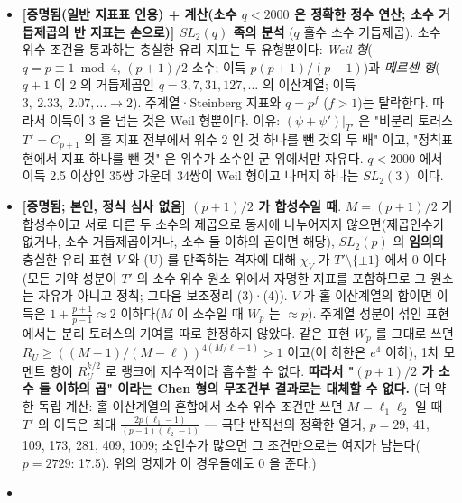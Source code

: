 \begin{itemize}
\item
  \textbf{{[}증명됨(일반 지표표 인용) + 계산(소수 \(q<2000\) 은 정확한 정수 연산; 소수 거듭제곱의 반 지표는 손으로){]} \(SL_2(q)\) 족의 분석} (\(q\) 홀수 소수 거듭제곱). 소수 위수 조건을 통과하는 충실한 유리 지표는 두 유형뿐이다: \emph{Weil 형}(\(q=p\equiv1\bmod4\), \((p+1)/2\) 소수; 이득 \(p(p+1)/(p-1)\))과 \emph{메르센 형}(\(q+1\) 이 2 의 거듭제곱인 \(q=3,7,31,127,\dots\) 의 이산계열; 이득 \(3,\ 2.33,\ 2.07,\dots\to2\)). 주계열·Steinberg 지표와 \(q=p^f\) (\(f>1\))는 탈락한다. 따라서 이득이 3 을 넘는 것은 Weil 형뿐이다. 이유: \((\psi+\psi')|_{T'}\) 은 "비분리 토러스 \(T'=C_{p+1}\) 의 홀 지표 전부에서 위수 2 인 것 하나를 뺀 것의 두 배" 이고, "정칙표현에서 지표 하나를 뺀 것" 은 위수가 소수인 군 위에서만 자유다. \(q<2000\) 에서 이득 2.5 이상인 35쌍 가운데 34쌍이 Weil 형이고 나머지 하나는 \(SL_2(3)\) 이다.
\item
  \textbf{{[}증명됨; 본인, 정식 심사 없음{]} \((p+1)/2\) 가 합성수일 때}. \(M=(p+1)/2\) 가 합성수이고 서로 다른 두 소수의 제곱으로 동시에 나누어지지 않으면(제곱인수가 없거나, 소수 거듭제곱이거나, 소수 둘 이하의 곱이면 해당), \(SL_2(p)\) 의 \textbf{임의의} 충실한 유리 표현 \(V\) 와 (U) 를 만족하는 격자에 대해 \(\chi_V\) 가 \(T'\setminus\{\pm1\}\) 에서 0 이다(모든 기약 성분이 \(T'\) 의 소수 위수 원소 위에서 자명한 지표를 포함하므로 그 원소는 자유가 아니고 정칙; 그다음 보조정리 (3)·(4)). \(V\) 가 홀 이산계열의 합이면 이득은 \(1+\tfrac{p+1}{p-1}\approx2\) 이하다(\(M\) 이 소수일 때 \(W_p\) 는 \(\approx p\)). 주계열 성분이 섞인 표현에서는 분리 토러스의 기여를 따로 한정하지 않았다. 같은 표현 \(W_p\) 를 그대로 쓰면 \(R_U\ge((M-1)/(M-\ell))^{4(M/\ell-1)}>1\) 이고(이 하한은 \(e^4\) 이하), 1차 모멘트 항이 \(R_U^{k/2}\) 로 랭크에 지수적이라 흡수할 수 없다. \textbf{따라서 "\((p+1)/2\) 가 소수 둘 이하의 곱" 이라는 Chen 형의 무조건부 결과로는 대체할 수 없다.} (더 약한 독립 계산: 홀 이산계열의 혼합에서 소수 위수 조건만 쓰면 \(M=\ell_1\ell_2\) 일 때 \(T'\) 의 이득은 최대 \(\tfrac{2p(\ell_1-1)}{(p-1)(\ell_2-1)}\) --- 극단 반직선의 정확한 열거, \(p=29\), 41, 109, 173, 281, 409, 1009; 소인수가 많으면 그 조건만으로는 여지가 남는다(\(p=2729\): 17.5). 위의 명제가 이 경우들에도 0 을 준다.)
\item

\end{itemize}
